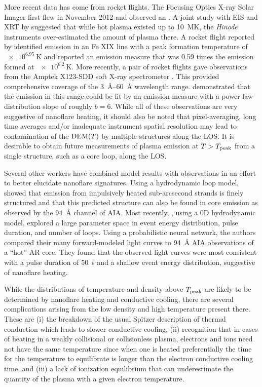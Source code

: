More recent data has come from rocket flights. The Focusing Optics X-ray Solar Imager \citep[FOXSI,][]{krucker_focusing_2013} first flew in November 2012 and observed an \AR. A joint study with EIS and XRT by \citet{ishikawa_constraining_2014} suggested that while hot plasma existed up to \SI{10}{\mega\kelvin}, the \textit{Hinode} instruments over-estimated the amount of plasma there. A rocket flight reported by \citet{brosius_pervasive_2014} identified emission in an Fe XIX line with a peak formation temperature of $\SI{e6.95}{\kelvin}$ and reported an emission measure that was 0.59 times the emission formed at $\SI{e6.2}{\kelvin}$. More recently, a pair of rocket flights gave observations from the Amptek X123-SDD soft X-ray spectrometer \citep{caspi_new_2015}. This provided comprehensive coverage of the \SIrange{3}{60}{\angstrom} wavelength range. \citeauthor{caspi_new_2015} demonstrated that the emission in this range could be fit by an emission measure with a power-law distribution slope of roughly $b = 6$. While all of these observations are very suggestive of nanoflare heating, it should also be noted that pixel-averaging, long time averages and/or inadequate instrument spatial resolution may lead to contamination of the $\dem[T]$ by multiple structures along the LOS. It is desirable to obtain future measurements of plasma emission at $T>T_\textup{peak}$ from a single structure, such as a core \AR{} loop, along the LOS.

Several other workers have combined model results with observations in an effort to better elucidate nanoflare signatures. Using a hydrodynamic loop model, \citet{reale_solar_2011} showed that emission from impulsively heated sub-arcsecond strands is finely structured and that this predicted structure can also be found in \AR{} core emission as observed by the \SI{94}{\angstrom} channel of AIA. Most recently, \citet{tajfirouze_time-resolved_2016}, using a 0D hydrodynamic model, explored a large parameter space in event energy distribution, pulse duration, and number of loops. Using a probabilistic neural network, the authors compared their many forward-modeled light curves to  \SI{94}{\angstrom} AIA observations of a ``hot'' AR core. They found that the observed light curves were most consistent with a pulse duration of \SI{50}{\second} and a shallow event energy distribution, suggestive of nanoflare heating.

While the distributions of temperature and density above $T_\textup{peak}$ are likely to be determined by nanoflare heating and conductive cooling, there are several complications arising from the low density and high temperature present there. These are (i) the breakdown of the usual Spitzer description of thermal conduction which leads to slower conductive cooling, (ii) recognition that in cases of heating in a weakly collisional or collisionless plasma, electrons and ions need not have the same temperature since when one is heated preferentially the time for the temperature to equilibrate is longer than the electron conductive cooling time, and (iii) a lack of ionization equilibrium that can underestimate the quantity of the plasma with a given electron temperature.

